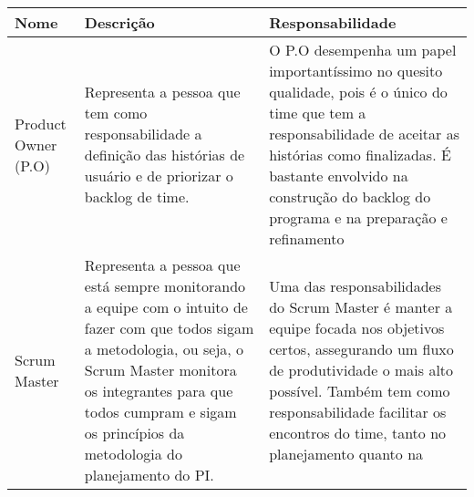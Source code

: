   \begin{table}[!htb]
    \centering
    \begin{tabular}{p{}p{6cm}p{6cm}} \hline
      \rowcolor{gray!50}
        \textbf{Nome}                    & \textbf{Descrição}                               & \textbf{Responsabilidade}                     \\
      \hline
        Product Owner (P.O)              & Representa a pessoa que tem como responsabilidade
                                           a definição das histórias de usuário e de
                                           priorizar o backlog de time.                     & O P.O desempenha um papel importantíssimo no
                                                                                              quesito qualidade, pois é o único do time que
                                                                                              tem a responsabilidade de aceitar as histórias
                                                                                              como finalizadas. É bastante envolvido na
                                                                                              construção do backlog do programa e na
                                                                                              preparação e refinamento                      \\
        Scrum Master                     & Representa a pessoa que está sempre monitorando
                                           a equipe com o intuito de fazer com que todos
                                           sigam a metodologia, ou seja, o Scrum Master
                                           monitora os integrantes para que todos cumpram
                                           e sigam os princípios da metodologia do
                                           planejamento do PI.                              & Uma das responsabilidades do Scrum Master é
                                                                                              manter a equipe focada nos objetivos certos,
                                                                                              assegurando um fluxo de produtividade o mais
                                                                                              alto possível. Também tem como
                                                                                              responsabilidade facilitar os encontros do
                                                                                              time, tanto no planejamento quanto na

\end{tabular}
\end{table}
